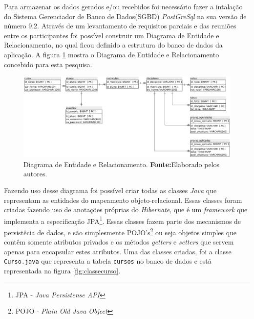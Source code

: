 		\par Para armazenar os dados gerados e/ou recebidos foi necessário fazer a
	intalação do Sistema Gerenciador de Banco de Dados(SGBD) \textit{PostGreSql} na
	sua versão de número 9.2. Através de um levantamento de requisitos parciais e das
	reuniões entre os participantes foi possível construir um Diagrama de Entidade
	e Relacionamento, no qual ficou definido a estrutura do banco de dados da
	aplicação. A figura \ref{fig:exemplo5} mostra o Diagrama de Entidade e
	Relacionamento concebido para esta pesquisa.

		\begin{figure}[h!]
			\centerline{\includegraphics[scale=0.5]{./imagens/imagem5.png}}
			\caption[Diagrama de Entidade e Relacionamento]{Diagrama de Entidade e
			Relacionamento.
			\textbf{Fonte:}Elaborado pelos autores.}
			\label{fig:exemplo5}
		\end{figure}

		\par Fazendo uso desse diagrama foi possível criar todas as classes
	\textit{Java} que representam as entidades do mapeamento objeto-relacional. 
	Essas classes foram criadas fazendo uso de anotações próprias do
	\textit{Hibernate}, que é um \textit{framework} que implementa a especificação
	JPA\footnote{JPA - \textit{Java Persistense API}}. Essas classes fazem parte
	dos mecanismos de persistêcia de dados, e são simplesmente POJO's\footnote{POJO
	- \textit{Plain Old Java Object }} ou seja objetos simples que contêm somente
	atributos privados e os métodos \textit{getters} e \textit{setters} que servem
	apenas para encapsular estes atributos. Uma das classes criadas, foi a classe
	\texttt{Curso.java} que representa a tabela \texttt{cursos} no banco de dados e
	está representada na figura \ref{fig:classecurso}.
	
	\pagebreak
	
